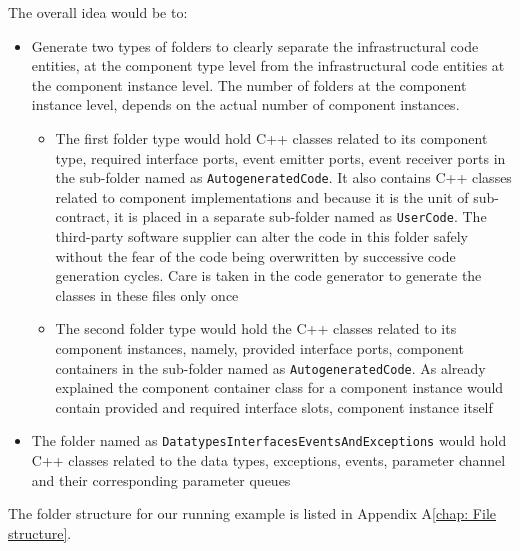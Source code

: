The overall idea would be to:
\begin{itemize}
\item Generate two types of folders to clearly separate the infrastructural code entities, at the component type level from the infrastructural code entities at the component instance level. The number of folders at the component instance level, depends on the actual number of component instances.   
\begin{itemize}
\item The first folder type would hold C++ classes related to its component type, required interface ports, event emitter ports, event receiver ports in the sub-folder named as \texttt{AutogeneratedCode}. It also contains C++ classes related to component implementations and because it is the unit of sub-contract, it is placed in a separate sub-folder named as \texttt{UserCode}. The third-party software supplier can alter the code in this folder safely without the fear of the code being overwritten by successive code generation cycles. Care is taken in the code generator to generate the classes in these files only once  
\item The second folder type would hold the C++ classes related to its component instances, namely, provided interface ports, component containers in the sub-folder named as \texttt{AutogeneratedCode}. As already explained the component container class for a component instance would contain provided and required interface slots, component instance itself   
\end{itemize} 
\item The folder named as \texttt{Datatypes\allowbreak Interfaces\allowbreak EventsAnd\allowbreak Exceptions} would hold C++ classes related to the data types, exceptions, events, parameter channel and their corresponding parameter queues 
\end{itemize}

The folder structure for our running example is listed in Appendix A\cref{chap: File structure}.
  



 

   

 


 
   



 


 
